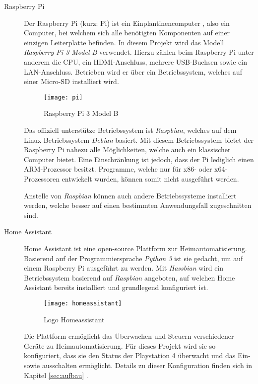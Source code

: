 \begin{description}
    \item[Raspberry Pi \cite{Whatisth47:online}]
        Der Raspberry Pi (kurz: Pi) ist ein Einplantinencomputer \cite{Einplati37:online}, also ein Computer,
        bei welchem sich alle benötigten Komponenten auf einer einzigen Leiterplatte befinden.
        In diesem Projekt wird das Modell \textit{Raspberry Pi 3 Model B} verwendet.
        Hierzu zählen beim Raspberry Pi unter anderem die CPU, ein HDMI-Anschluss, mehrere USB-Buchsen sowie ein LAN-Anschluss.
        Betrieben wird er über ein Betriebssystem, welches auf einer Micro-SD installiert wird.

        \begin{figure}[h!]
            \centering
            \texttt{[image: pi]}
            \caption{Raspberry Pi 3 Model B \cite{Raspberr2:online}}\label{fig:pi}
        \end{figure}

        Das offiziell unterstütze Betriebssystem ist \textit{Raspbian}, welches auf dem Linux-Betriebssystem \textit{Debian} basiert.
        Mit diesem Betriebssystem bietet der Raspberry Pi nahezu alle Möglichkeiten, welche auch ein klassischer Computer bietet.
        Eine Einschränkung ist jedoch, dass der Pi lediglich einen ARM-Prozessor besitzt.
        Programme, welche nur für x86- oder x64-Prozessoren entwickelt wurden, können somit nicht ausgeführt werden.

        Anstelle von \textit{Raspbian} können auch andere Betriebssysteme installiert werden,
        welche besser auf einen bestimmten Anwendungsfall zugeschnitten sind.

    \item[Home Assistant \cite{HomeAssi51:online}]
        Home Assistant ist eine open-source Plattform zur Heimautomatisierung.
        Basierend auf der Programmiersprache \textit{Python 3} ist sie gedacht,
        um auf einem Raspberry Pi ausgeführt zu werden.
        Mit \textit{Hassbian} wird ein Betriebssystem basierend auf \textit{Raspbian} angeboten,
        auf welchen Home Assistant bereits installiert und grundlegend konfiguriert ist.

        \begin{figure}[h!]
            \centering
            \texttt{[image: homeassistant]}
            \caption{Logo Homeassistant}\label{fig:homeassistant}
        \end{figure}

        Die Plattform ermöglicht das Überwachen und Steuern verschiedener Geräte zu Heimautomatisierung.
        Für dieses Projekt wird sie so konfiguriert,
        dass sie den Status der Playstation 4 überwacht und das Ein- sowie ausschalten ermöglicht.
        Details zu dieser Konfiguration finden sich in Kapitel \ref{sec:aufbau} \textit{}.


\end{description}
